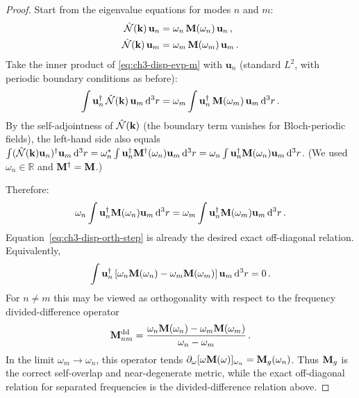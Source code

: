 \begin{proof}
Start from the eigenvalue equations for modes $n$ and $m$:
\begin{align}
  \hat{\mathcal{N}}(\mathbf{k})\,\mathbf{u}_n &= \omega_n\,\mathbf{M}(\omega_n)\,\mathbf{u}_n\,,
  \label{eq:ch3-disp-evp-n}\\
  \hat{\mathcal{N}}(\mathbf{k})\,\mathbf{u}_m &= \omega_m\,\mathbf{M}(\omega_m)\,\mathbf{u}_m\,.
  \label{eq:ch3-disp-evp-m}
\end{align}
Take the inner product of \eqref{eq:ch3-disp-evp-m} with
$\mathbf{u}_n$ (standard $L^2$, with periodic boundary conditions as
before):
\begin{equation}
  \int\mathbf{u}_n^\dagger\,\hat{\mathcal{N}}(\mathbf{k})\,\mathbf{u}_m\,\mathrm{d}^3r
  = \omega_m\int\mathbf{u}_n^\dagger\,\mathbf{M}(\omega_m)\,\mathbf{u}_m\,\mathrm{d}^3r\,.
\end{equation}
By the self-adjointness of $\hat{\mathcal{N}}(\mathbf{k})$ (the boundary term vanishes
for Bloch-periodic fields), the left-hand side also equals
$\int(\hat{\mathcal{N}}(\mathbf{k})\mathbf{u}_n)^\dagger\mathbf{u}_m\,\mathrm{d}^3r
=\omega_n^*\int\mathbf{u}_n^\dagger\mathbf{M}^\dagger(\omega_n)\mathbf{u}_m\,\mathrm{d}^3r
=\omega_n\int\mathbf{u}_n^\dagger\mathbf{M}(\omega_n)\mathbf{u}_m\,\mathrm{d}^3r$.
(We used $\omega_n\in\mathbb{R}$ and $\mathbf{M}^\dagger=\mathbf{M}$.)

Therefore:
\begin{equation}\label{eq:ch3-disp-orth-step}
  \omega_n\int\mathbf{u}_n^\dagger\mathbf{M}(\omega_n)\mathbf{u}_m\,\mathrm{d}^3r
  = \omega_m\int\mathbf{u}_n^\dagger\mathbf{M}(\omega_m)\mathbf{u}_m\,\mathrm{d}^3r\,.
\end{equation}
Equation~\eqref{eq:ch3-disp-orth-step} is already the desired exact
off-diagonal relation.  Equivalently,
\begin{equation}\label{eq:ch3-divided-difference-orth}
  \int \mathbf{u}_n^\dagger
  \left[
    \omega_n\mathbf{M}(\omega_n)-\omega_m\mathbf{M}(\omega_m)
  \right]
  \mathbf{u}_m\,\mathrm{d}^3r = 0\,.
\end{equation}
For $n\neq m$ this may be viewed as orthogonality with respect to the
frequency divided-difference operator
\begin{equation}\label{eq:ch3-divided-difference-metric}
  \mathbf{M}_{nm}^{\mathrm{dd}}
  = \frac{\omega_n\mathbf{M}(\omega_n)-\omega_m\mathbf{M}(\omega_m)}
  {\omega_n-\omega_m}\,.
\end{equation}
In the limit $\omega_m\to\omega_n$, this operator tends
$\partial_\omega[\omega\mathbf{M}(\omega)]_{\omega_n}=\mathbf{M}_g(\omega_n)$.
Thus $\mathbf{M}_g$ is the correct self-overlap and near-degenerate metric,
while the exact off-diagonal relation for separated frequencies is the
divided-difference relation above.
\end{proof}

